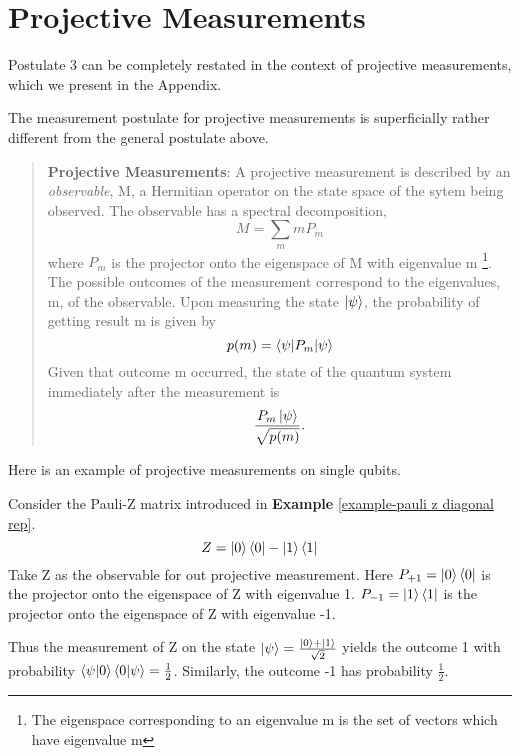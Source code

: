 
\chapter{Projective Measurements} %

\label{AppendixB} %
Postulate 3 can be completely restated in the context of projective measurements, which we present in the Appendix.




The measurement postulate for projective measurements is superficially rather different from the general postulate above.
\begin{quote}
    \textbf{Projective Measurements}: A projective measurement is described by an \textit{observable}, M, a Hermitian operator on the state space of the sytem being observed. The observable has a spectral decomposition,
    \begin{equation}
        M=\sum_m m P_m
    \end{equation}
    where $P_m$ is the projector onto the eigenspace of M with eigenvalue m \footnote{The eigenspace corresponding to an eigenvalue m is the set of vectors which have eigenvalue m}. The possible outcomes of the measurement correspond to the eigenvalues, m, of the observable. Upon measuring the state $\ket{\psi}$, the probability of getting result m is given by 
    \begin{equation}
        p(m)=\braket{\psi|P_m|\psi}
    \end{equation}
    Given that outcome m occurred, the state of the quantum system immediately after the measurement is 
    \begin{equation}
        \frac{P_m \ket{\psi}}{\sqrt{p(m)}}.
    \end{equation}
\end{quote}

Here is an example of projective measurements on single qubits.
\begin{example}
Consider the Pauli-Z matrix introduced in \textbf{Example} \ref{example-pauli z diagonal rep}.
\begin{equation}
    Z=\ket{0}\bra{0}-\ket{1}\bra{1}
\end{equation}
Take Z as the observable for out projective measurement. Here $P_{+1}=\ket{0}\bra{0}$ is the projector onto the eigenspace of Z with eigenvalue 1. $P_{-1}=\ket{1}\bra{1}$ is the projector onto the eigenspace of Z with eigenvalue -1.

Thus the measurement of Z on the state $\ket{\psi}=\frac{\ket{0}+\ket{1}}{\sqrt{2}}$ yields the outcome 1 with probability $\braket{\psi|0}\braket{0|\psi}=\frac{1}{2}$. Similarly, the outcome -1 has probability $\frac{1}{2}$.
\end{example}

